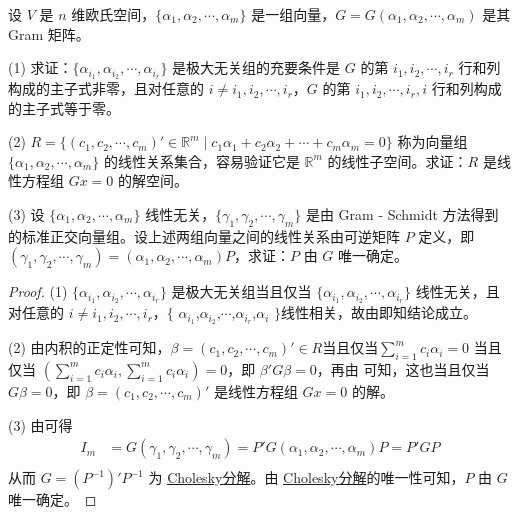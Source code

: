 \documentclass[../../main.tex]{subfiles}
\begin{document}
\begin{proposition}\label{proposition:例9.36}
设 \(V\) 是 \(n\) 维欧氏空间，\(\{\alpha_1,\alpha_2,\cdots,\alpha_m\}\) 是一组向量，\(G = G(\alpha_1,\alpha_2,\cdots,\alpha_m)\) 是其 Gram 矩阵。

(1) 求证：\(\{\alpha_{i_1},\alpha_{i_2},\cdots,\alpha_{i_r}\}\) 是极大无关组的充要条件是 \(G\) 的第 \(i_1,i_2,\cdots,i_r\) 行和列构成的主子式非零，且对任意的 \(i\neq i_1,i_2,\cdots,i_r\)，\(G\) 的第 \(i_1,i_2,\cdots,i_r,i\) 行和列构成的主子式等于零。

(2) \(R = \{(c_1,c_2,\cdots,c_m)'\in\mathbb{R}^m\mid c_1\alpha_1 + c_2\alpha_2 + \cdots + c_m\alpha_m = 0\}\) 称为向量组 \(\{\alpha_1,\alpha_2,\cdots,\alpha_m\}\) 的线性关系集合，容易验证它是 \(\mathbb{R}^m\) 的线性子空间。求证：\(R\) 是线性方程组 \(Gx = 0\) 的解空间。

(3) 设 \(\{\alpha_1,\alpha_2,\cdots,\alpha_m\}\) 线性无关，\(\{\gamma_1,\gamma_2,\cdots,\gamma_m\}\) 是由 Gram - Schmidt 方法得到的标准正交向量组。设上述两组向量之间的线性关系由可逆矩阵 \(P\) 定义，即 \((\gamma_1,\gamma_2,\cdots,\gamma_m)=(\alpha_1,\alpha_2,\cdots,\alpha_m)P\)，求证：\(P\) 由 \(G\) 唯一确定。
\end{proposition}
\begin{proof}
(1) \(\{\alpha_{i_1},\alpha_{i_2},\cdots,\alpha_{i_r}\}\) 是极大无关组当且仅当 \(\{\alpha_{i_1},\alpha_{i_2},\cdots,\alpha_{i_r}\}\) 线性无关，且对任意的 $i\neq i_1,i_2,\cdots,i_r$，$\{$ $\alpha_{i_1}$,$\alpha_{i_2}$,$\cdots$,$\alpha_{i_r}$,$\alpha_i$ $\}$线性相关，故由即知结论成立。

(2) 由内积的正定性可知，\(\beta=(c_1,c_2,\cdots,c_m)'\in R\)当且仅当$\sum_{i = 1}^{m}c_i\alpha_i=0$ 当且仅当 \((\sum_{i = 1}^{m}c_i\alpha_i,\sum_{i = 1}^{m}c_i\alpha_i)=0\)，即 \(\beta'G\beta = 0\)，再由 可知，这也当且仅当 \(G\beta = 0\)，即 \(\beta=(c_1,c_2,\cdots,c_m)'\) 是线性方程组 \(Gx = 0\) 的解。 

(3) 由可得
\begin{align*}
I_m &= G(\gamma_1,\gamma_2,\cdots,\gamma_m)=P'G(\alpha_1,\alpha_2,\cdots,\alpha_m)P = P'GP\\
\end{align*}
从而 \(G=(P^{-1})'P^{-1}\) 为 \hyperref[proposition:正定阵的3个充要条件]{Cholesky分解}。由 \hyperref[proposition:正定阵的3个充要条件]{Cholesky分解}的唯一性可知，\(P\) 由 \(G\) 唯一确定。

\end{proof}
\end{document}
